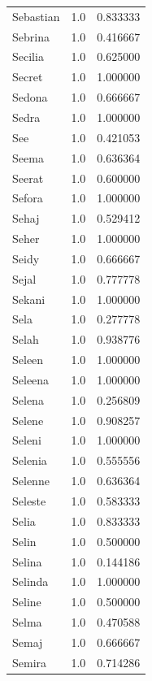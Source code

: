 \documentclass[
  letterpaper,
  DIV=11,
  numbers=noendperiod]{scrreprt}
\begin{document}
\begin{tabular}{lrr}
Sebastian       &   1.0 &   0.833333 \\
Sebrina         &   1.0 &   0.416667 \\
Secilia         &   1.0 &   0.625000 \\
Secret          &   1.0 &   1.000000 \\
Sedona          &   1.0 &   0.666667 \\
Sedra           &   1.0 &   1.000000 \\
See             &   1.0 &   0.421053 \\
Seema           &   1.0 &   0.636364 \\
Seerat          &   1.0 &   0.600000 \\
Sefora          &   1.0 &   1.000000 \\
Sehaj           &   1.0 &   0.529412 \\
Seher           &   1.0 &   1.000000 \\
Seidy           &   1.0 &   0.666667 \\
Sejal           &   1.0 &   0.777778 \\
Sekani          &   1.0 &   1.000000 \\
Sela            &   1.0 &   0.277778 \\
Selah           &   1.0 &   0.938776 \\
Seleen          &   1.0 &   1.000000 \\
Seleena         &   1.0 &   1.000000 \\
Selena          &   1.0 &   0.256809 \\
Selene          &   1.0 &   0.908257 \\
Seleni          &   1.0 &   1.000000 \\
Selenia         &   1.0 &   0.555556 \\
Selenne         &   1.0 &   0.636364 \\
Seleste         &   1.0 &   0.583333 \\
Selia           &   1.0 &   0.833333 \\
Selin           &   1.0 &   0.500000 \\
Selina          &   1.0 &   0.144186 \\
Selinda         &   1.0 &   1.000000 \\
Seline          &   1.0 &   0.500000 \\
Selma           &   1.0 &   0.470588 \\
Semaj           &   1.0 &   0.666667 \\
Semira          &   1.0 &   0.714286 \\

\end{tabular}
\end{document}
